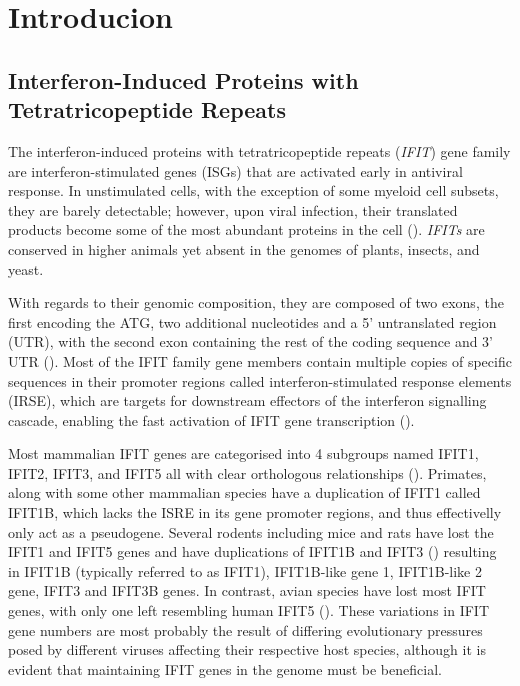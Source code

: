 \chapter{Introducion} \label{ch:Introduction}
\section{Interferon-Induced Proteins with Tetratricopeptide Repeats} \label{sec:Interferon-Induced Proteins with Tetratricopeptide Repeats}
The interferon-induced proteins with tetratricopeptide repeats (\textit{IFIT}) gene family are interferon-stimulated genes (ISGs) that are activated early in antiviral response. In unstimulated cells, with the exception of some myeloid cell subsets, they are barely detectable; however, upon viral infection, their translated products become some of the most abundant proteins in the cell (\cite{Diamond2013TheProteins}). \textit{IFITs} are conserved in higher animals yet absent in the genomes of plants, insects, and yeast. 

With regards to their genomic composition, they are composed of two exons, the first encoding the ATG, two additional nucleotides and a 5' untranslated region (UTR), with the second exon containing the rest of the coding sequence and 3' UTR (\cite{deVeer1998IFI60/ISG60/IFIT4Genes}). Most of the IFIT family gene members contain multiple copies of specific sequences in their promoter regions called interferon-stimulated response elements (IRSE), which are targets for downstream effectors of the interferon signalling cascade, enabling the fast activation of IFIT gene transcription (\cite{Lou2009IFR-9/STAT2STAT1}).   

Most mammalian IFIT genes are categorised into 4 subgroups named IFIT1, IFIT2, IFIT3, and IFIT5 all with clear orthologous relationships (\cite{Sarkar2004NovelGenes}). Primates, along with some other mammalian species have a duplication of IFIT1 called IFIT1B, which lacks the ISRE in its gene promoter regions, and thus effectivelly only act as a pseudogene. Several rodents including mice and rats have lost the IFIT1 and IFIT5 genes and have duplications of IFIT1B and IFIT3 (\cite{Daugherty2016Evolution-guidedMammals.}) resulting in IFIT1B (typically referred to as IFIT1), IFIT1B-like gene 1, IFIT1B-like 2 gene, IFIT3 and IFIT3B genes. In contrast, avian species have lost most IFIT genes, with only one left resembling human IFIT5 (\cite{Liu2013Lineage-SpecificFamily}). These variations in IFIT gene numbers are most probably the result of differing evolutionary pressures posed by different viruses affecting their respective host species, although it is evident that maintaining IFIT genes in the genome must be beneficial. 

